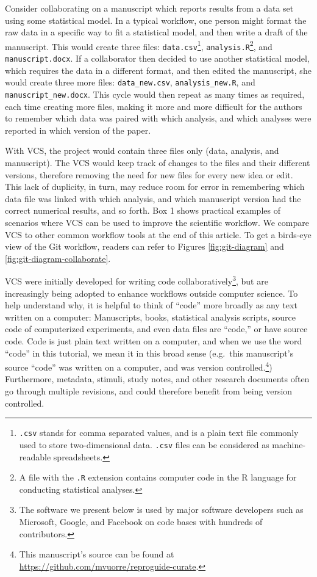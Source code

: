 \documentclass[
  american,
  ,doc,floatsintext]{apa6}
\begin{document}
Consider collaborating on a manuscript which reports results from a data set using some statistical model. In a typical workflow, one person might format the raw data in a specific way to fit a statistical model, and then write a draft of the manuscript. This would create three files: \texttt{data.csv}\footnote{\texttt{.csv} stands for comma separated values, and is a plain text file commonly used to store two-dimensional data. \texttt{.csv} files can be considered as machine-readable spreadsheets.}, \texttt{analysis.R}\footnote{A file with the \texttt{.R} extension contains computer code in the R language for conducting statistical analyses.}, and \texttt{manuscript.docx}. If a collaborator then decided to use another statistical model, which requires the data in a different format, and then edited the manuscript, she would create three more files: \texttt{data\_new.csv}, \texttt{analysis\_new.R}, and \texttt{manuscript\_new.docx}. This cycle would then repeat as many times as required, each time creating more files, making it more and more difficult for the authors to remember which data was paired with which analysis, and which analyses were reported in which version of the paper.

With VCS, the project would contain three files only (data, analysis, and manuscript). The VCS would keep track of changes to the files and their different versions, therefore removing the need for new files for every new idea or edit. This lack of duplicity, in turn, may reduce room for error in remembering which data file was linked with which analysis, and which manuscript version had the correct numerical results, and so forth. Box 1 shows practical examples of scenarios where VCS can be used to improve the scientific workflow. We compare VCS to other common workflow tools at the end of this article. To get a birds-eye view of the Git workflow, readers can refer to Figures \ref{fig:git-diagram} and \ref{fig:git-diagram-collaborate}.

VCS were initially developed for writing code collaboratively\footnote{The software we present below is used by major software developers such as Microsoft, Google, and Facebook on code bases with hundreds of contributors.}, but are increasingly being adopted to enhance workflows outside computer science. To help understand why, it is helpful to think of ``code'' more broadly as any text written on a computer: Manuscripts, books, statistical analysis scripts, source code of computerized experiments, and even data files are ``code,'' or have source code. Code is just plain text written on a computer, and when we use the word ``code'' in this tutorial, we mean it in this broad sense (e.g.~this manuscript's source ``code'' was written on a computer, and was version controlled.\footnote{This manuscript's source can be found at \url{https://github.com/mvuorre/reproguide-curate}.}) Furthermore, metadata, stimuli, study notes, and other research documents often go through multiple revisions, and could therefore benefit from being version controlled.
\end{document}
